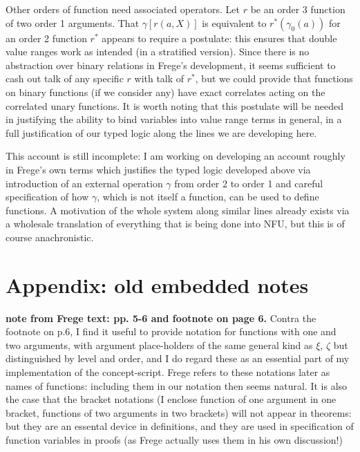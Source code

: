 \documentclass{article}
\begin{document}
{{Other orders of function need associated operators.  Let $r$ be an order 3 function of two order 1 arguments.   That $\gamma[r(a,X)]$ is equivalent to $r^*(\gamma_0(a))$ for an order 2 function $r^*$ appears to require
a postulate:  this ensures that double value ranges work as intended (in a stratified version).  Since there is no abstraction over binary relations in Frege's development, it seems sufficient to cash out talk of any specific
$r$ with talk of $r^*$, but we could provide that functions on binary functions (if we consider any) have exact correlates acting on the correlated unary functions.  It is worth noting that this postulate will be needed in
justifying the ability to bind variables into value range terms in general, in a full justification of our typed  logic along the lines we are developing here.

This account is still incomplete:  I am working on developing an account roughly in Frege's own terms which justifies the typed logic developed above via introduction of an external operation $\gamma$ from order 2 to
order 1 and careful specification of how $\gamma$, which is not itself a function, can be used to define functions.  A motivation of the whole system along similar lines already exists via a wholesale translation of everything that is being done into NFU, but this is of course anachronistic.

\newpage

\section{Appendix:  old embedded notes}

{\bf note from Frege text:  pp. 5-6 and footnote on page 6.}  Contra the footnote on p.6, I find it useful to provide notation for functions with one and two arguments, with argument place-holders
of the same general kind as $\xi$, $\zeta$ but distinguished by level and order, and I do regard these as an essential part of my implementation of the concept-script.  Frege refers to these notations later as names of functions:  including them in our notation then seems natural.  It is also the case that the bracket notations (I enclose function of one argument in one bracket, functions of two arguments in two brackets) will not appear in theorems:  but they are an essental device in definitions, and they are used in specification of function variables in proofs (as Frege actually uses them in his own discussion!)



}}
\end{document}
